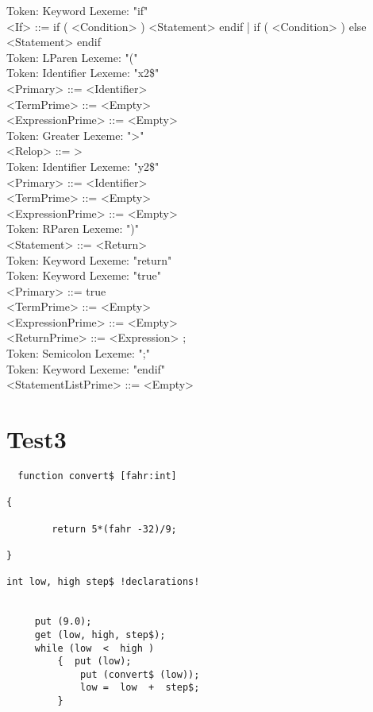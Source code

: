 \documentclass[11pt]{article}
\begin{document}
Token: Keyword   Lexeme: "if" \\
        <If> ::= if ( <Condition> ) <Statement> endif | if (
<Condition> ) else <Statement> endif \\
Token: LParen    Lexeme: "(" \\
Token: Identifier        Lexeme: "x2\$" \\
        <Primary> ::= <Identifier> \\
        <TermPrime> ::= <Empty> \\
        <ExpressionPrime> ::= <Empty> \\
Token: Greater   Lexeme: ">" \\
        <Relop> ::= > \\
Token: Identifier        Lexeme: "y2\$" \\
        <Primary> ::= <Identifier> \\
        <TermPrime> ::= <Empty> \\
        <ExpressionPrime> ::= <Empty> \\
Token: RParen    Lexeme: ")" \\
        <Statement> ::= <Return> \\
Token: Keyword   Lexeme: "return" \\
Token: Keyword   Lexeme: "true" \\
        <Primary> ::= true \\
        <TermPrime> ::= <Empty> \\
        <ExpressionPrime> ::= <Empty> \\
        <ReturnPrime> ::= <Expression> ; \\
Token: Semicolon         Lexeme: ";" \\
Token: Keyword   Lexeme: "endif" \\
        <StatementListPrime> ::= <Empty> \\
\section*{Test3}
\label{sec-3}
\begin{verbatim}
  function convert$ [fahr:int]

{

        return 5*(fahr -32)/9;

}

int low, high step$ !declarations!


     put (9.0);
     get (low, high, step$);
     while (low  <  high )
         {  put (low);
             put (convert$ (low));
             low =  low  +  step$;
         }
\end{verbatim}
\end{document}
